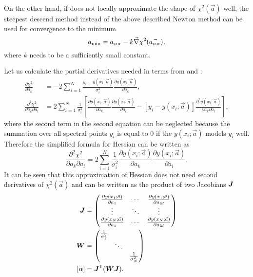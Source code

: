 On the other hand, if
does not locally approximate the shape of $\chi^2(\vec{a})$ well, the steepest
descend method instead of the above described Newton method can be used for
convergence to the minimum
\begin{equation}
	a_\text{min} = a_\text{cur} - k\vec{\nabla}\chi^2(\vec{a_\text{cur}}),
	\label{\eqnlabel{minimization:gradient_min}}
\end{equation}
where $k$ needs to be a sufficiently small constant.

Let us calculate the partial derivatives needed in terms from
 and :
\begin{align*}
	\frac{\partial\chi^2}{\partial{}a_k} &= -2\sum_{i=1}^N{
		\frac{y_i - y(x_i;\vec{a})}{\sigma_i^2}
		\frac{\partial{}y(x_i;\vec{a})}{\partial{}a_k}
	},\\
	\frac{\partial^2\chi^2}{\partial{}a_k\partial{}a_l} &= 2\sum_{i=1}^N{
		\frac{1}{\sigma_i^2}\left[
			\frac{\partial{}y(x_i;\vec{a})}{\partial{}a_k}
			\frac{\partial{}y(x_i;\vec{a})}{\partial{}a_l}
			- [y_i - y(x_i;\vec{a})]
				\frac{\partial^2{}y(x_i;\vec{a})}{\partial{}a_k\partial{}a_l}
		\right]
	},
\end{align*}
where the second term in the second equation can be neglected because the
summation over all spectral points $y_i$ is equal to 0 if the
$y(x_i;\vec{a})$ models $y_i$ well. Therefore the simplified formula for
Hessian can be written as
\begin{equation*}
	\frac{\partial^2\chi^2}{\partial{}a_k\partial{}a_l} = 2\sum_{i=1}^N{
		\frac{1}{\sigma_i^2}
		\frac{\partial{}y(x_i;\vec{a})}{\partial{}a_k}
		\frac{\partial{}y(x_i;\vec{a})}{\partial{}a_l}
	}.
\end{equation*}
It can be seen that this approximation of Hessian does not need second
derivatives of $\chi^2(\vec{a})$ and can be written as the product of two
Jacobians $\bm{J}$
\begin{align*}
	\bm{J} &=
		\begin{pmatrix}
			\frac{\partial{}y(x_1;\vec{a})}{\partial{}a_1} & \cdots & \frac{\partial{}y(x_1;\vec{a})}{\partial{}a_M} \\
			\vdots                                         & \ddots & \vdots \\
			\frac{\partial{}y(x_N;\vec{a})}{\partial{}a_1} & \cdots & \frac{\partial{}y(x_N;\vec{a})}{\partial{}a_M}
		\end{pmatrix}\\
	\bm{W} &=
		\begin{pmatrix}
			\frac{1}{\sigma_1^2} \\
			& \ddots \\
			&& \frac{1}{\sigma_N^2}
		\end{pmatrix}\\
	[\alpha] &= \bm{J}^\mathsf{T}(\bm{W}\bm{J}).
\end{align*}

